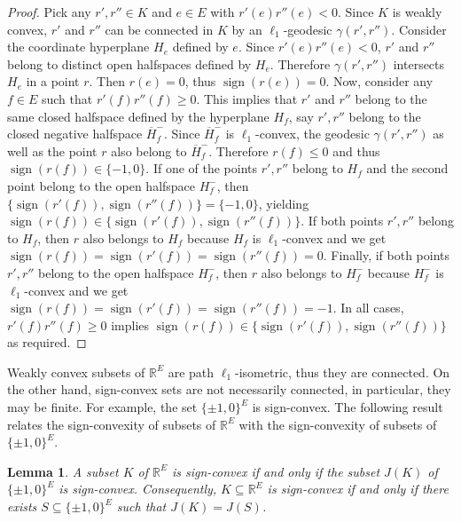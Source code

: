 \documentclass[11pt,a4paper]{amsart}
\newtheorem{lemma}{Lemma}
\theoremstyle{definition}
\numberwithin{equation}{section}
\DeclareMathOperator{\sign}{sign}
\newcommand{\hcovectors}{J}
\begin{document}
\begin{proof} Pick any $r',r''\in K$ and $e\in E$ with $r'(e)r''(e)<0$. Since $K$ is weakly convex, $r'$ and $r''$ can be connected in $K$ by an $\ell_1$-geodesic $\gamma(r',r'')$. Consider the coordinate hyperplane $H_{e}$  defined by $e$.  Since  $r'(e)r''(e)<0$, $r'$ and $r''$ belong to distinct open halfspaces defined by $H_e$. Therefore $\gamma(r',r'')$ intersects $H_e$ in a point $r$. Then $r(e)=0$, thus $\sign(r(e))=0$. Now, consider any $f\in E$ such that $r'(f)r''(f)\ge 0$. This implies that  $r'$ and $r''$ belong to the same closed halfspace defined by the hyperplane $H_f$, say $r',r''$ belong to the closed negative halfspace $\overline{H}_f^-$. Since  $\overline{H}_f^-$ is $\ell_1$-convex, the geodesic $\gamma(r',r'')$ as well as the point $r$ also belong to $\overline{H}_f^-$. Therefore $r(f)\le 0$ and thus $\sign(r(f))\in \{ -1,0\}$. If one of the points $r',r''$ belong to $H_f$ and the second point belong to the open halfspace $H^-_f$, then $\{ \sign(r'(f)),\sign(r''(f))\}=\{ -1,0\}$, yielding $\sign(r(f))\in \{ \sign(r'(f)),\sign(r''(f))\}$. If both points $r',r''$ belong
to $H_f$, then $r$ also belongs to $H_f$ because $H_f$ is $\ell_1$-convex and we get $\sign(r(f))=\sign(r'(f))=\sign(r''(f))=0$. Finally, if both points $r',r''$ belong
to the open halfspace $H^-_f$, then $r$ also belongs to $H^-_f$ because $H^-_f$ is $\ell_1$-convex and we get $\sign(r(f))=\sign(r'(f))=\sign(r''(f))=-1$. In all cases, $r'(f)r''(f)\ge 0$ implies $\sign(r(f))\in  \{ \sign(r'(f)),\sign(r''(f))\}$ as required.
\end{proof}

Weakly convex subsets of ${\mathbb R}^E$ are path $\ell_1$-isometric, thus they are connected. On the other hand, sign-convex sets are not necessarily connected, in particular, they may be finite. For example, the set $\{ \pm 1,0\}^E$ is sign-convex. The following result relates the sign-convexity of subsets of ${\mathbb R}^E$ with the sign-convexity of subsets of $\{ \pm 1,0\}^E$.

\begin{lemma}\label{sign-convex} A subset $K$ of ${\mathbb R}^E$ is sign-convex if and only if the subset $J(K)$ of $\{ \pm 1,0\}^E$ is sign-convex. Consequently, $K\subseteq {\mathbb R}^E$ is sign-convex if and only if there exists $S\subseteq \{ \pm 1,0\}^E$ such that $\hcovectors(K)=\hcovectors(S)$.
\end{lemma}
\end{document}
